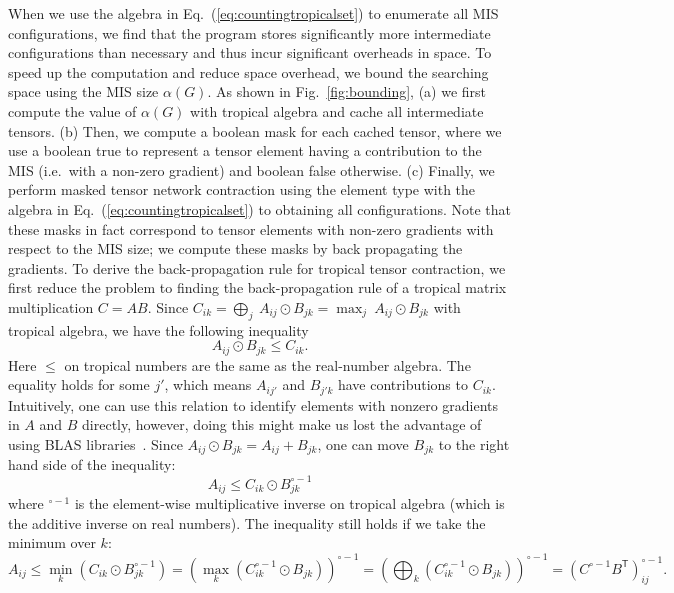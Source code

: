 \documentclass[onefignum, onetabnum]{siamart190516}
\newcommand{\<}{\langle}
\renewcommand{\>}{\rangle}
\newcommand{\Eq}[1]{Eq.~(\ref{#1})}
\newcommand{\Fig}[1]{Fig.~\ref{#1}}
\begin{document}
When we use the algebra in \Eq{eq:countingtropicalset} to enumerate all MIS configurations, we find that the program stores significantly more intermediate configurations than necessary and thus incur significant overheads in space.
To speed up the computation and reduce space overhead, we bound the searching space using the MIS size $\alpha(G)$.
As shown in \Fig{fig:bounding}, (a) we first compute the value of $\alpha(G)$ with tropical algebra and cache all intermediate tensors.
(b) Then, we compute a boolean mask for each cached tensor, where we use a boolean true to represent a tensor element having a contribution to the MIS (i.e.\ with a non-zero gradient) and boolean false otherwise.
(c) Finally, we perform masked tensor network contraction using the element type with the algebra in \Eq{eq:countingtropicalset} to obtaining all configurations.
Note that these masks in fact correspond to tensor elements with non-zero gradients with respect to the MIS size; we compute these masks by back propagating the gradients.
To derive the back-propagation rule for tropical tensor contraction,
we first reduce the problem to finding the back-propagation rule of a tropical matrix multiplication $C = A B$.
Since $ C_{ik} = \bigoplus_{j} \ A_{ij} \odot B_{jk} = \max_{j} \ A_{ij} \odot B_{jk}$ with tropical algebra, we have the following inequality
\begin{equation}
    A_{ij} \odot B_{jk} \leq C_{ik}.
\end{equation}
Here $\leq$ on tropical numbers are the same as the real-number algebra.
The equality holds for some $j'$, which means $A_{ij'}$ and $B_{j'k}$ have contributions to $C_{ik}$.
Intuitively, one can use this relation to identify elements with nonzero gradients in $A$ and $B$ directly,
however, doing this might make us lost the advantage of using BLAS libraries~\cite{TropicalGEMM}.
Since $A_{ij} \odot B_{jk} = A_{ij} + B_{jk}$, one can move $B_{jk}$ to the right hand side of the inequality: 
\begin{equation}
    A_{ij} \leq C_{ik} \odot B_{jk}^{\circ -1}
\end{equation}
where ${}^{\circ -1}$ is the element-wise multiplicative inverse on tropical algebra (which is the additive inverse on real numbers).
The inequality still holds if we take the minimum over $k$: 
\begin{equation}
    A_{ij} \leq \min_{k}(C_{ik} \odot B_{jk}^{\circ -1}) = \left(\max_{k} \left(C_{ik}^{\circ -1} \odot B_{jk} \right) \right)^{\circ -1} = \left(\bigoplus_{k} \left(C_{ik}^{\circ -1} \odot B_{jk} \right) \right)^{\circ -1} = \left( C^{\circ-1} B^{\mathsf{T}} \right)^{\circ -1}_{ij}.
\end{equation}
\end{document}

